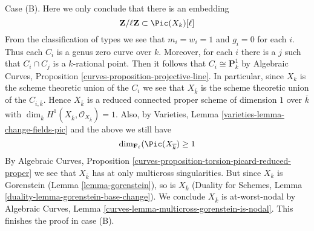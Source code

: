 \medskip\noindent
Case (B). Here we only conclude that there is an embedding
$$
\mathbf{Z}/\ell \mathbf{Z} \subset \Pic(X_k)[\ell]
$$
From the classification of types we see that $m_i = w_i = 1$ and $g_i = 0$
for each $i$. Thus each $C_i$ is a genus zero curve over $k$.
Moreover, for each $i$ there is a $j$ such that
$C_i \cap C_j$ is a $k$-rational point. Then it follows that
$C_i \cong \mathbf{P}^1_k$ by
Algebraic Curves, Proposition \ref{curves-proposition-projective-line}.
In particular, since $X_k$ is the scheme theoretic union of the
$C_i$ we see that $X_{\overline{k}}$ is the
scheme theoretic union of the $C_{i, \overline{k}}$.
Hence $X_{\overline{k}}$ is a reduced connected proper
scheme of dimension $1$ over $\overline{k}$ with $\dim_{\overline{k}}
H^1(X_{\overline{k}}, \mathcal{O}_{X_{\overline{k}}}) = 1$.
Also, by Varieties, Lemma \ref{varieties-lemma-change-fields-pic}
and the above we still have
$$
\dim_{\mathbf{F}_\ell}(\Pic(X_{\overline{k}}) \geq 1
$$
By Algebraic Curves, Proposition
\ref{curves-proposition-torsion-picard-reduced-proper}
we see that $X_{\overline{k}}$ has at only multicross singularities.
But since $X_k$ is Gorenstein (Lemma \ref{lemma-gorenstein}),
so is $X_{\overline{k}}$ (Duality for Schemes, Lemma
\ref{duality-lemma-gorenstein-base-change}).
We conclude $X_{\overline{k}}$ is at-worst-nodal by
Algebraic Curves, Lemma \ref{curves-lemma-multicross-gorenstein-is-nodal}.
This finishes the proof in case (B).

